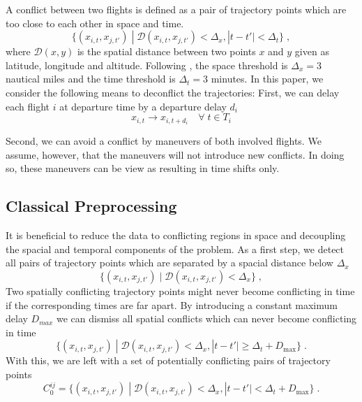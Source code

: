 \documentclass[aps,pra,twocolumn,10pt]{revtex4-1}
\begin{document}
A conflict between two flights is defined as a pair of trajectory points which are too close to each other in space and time.
\begin{equation} \label{eqn:conflicting_trajectory_points}
    \{ (x_{i, t},  x_{j, t'}) \; | \; \mathcal{D} (x_{i, t}, x_{j, t'}) < \Delta_x ,  |t - t'| < \Delta_t \} \; ,
\end{equation}
where $\mathcal{D}(x, y)$ is the spatial distance between two points $x$ and $y$ given as latitude, longitude and altitude.
Following \cite{rodionova16}, the space threshold is $\Delta_x = 3$ nautical miles and the time threshold is $\Delta_t = 3$ minutes.
In this paper, we consider the following means to deconflict the trajectories:
First, we can delay each flight $i$ at departure time by a departure delay $d_i$
\begin{equation*}
    x_{i, t} \to x_{i, t + d_i} \quad \forall \; t \in T_{i}
\end{equation*}

Second, we can avoid a conflict by maneuvers of both involved flights.
We assume, however, that the maneuvers will not introduce new conflicts. 
In doing so, these maneuvers can be view as resulting in time shifts only.

\subsection{Classical Preprocessing}
It is beneficial to reduce the data to conflicting regions in space and decoupling the spacial and temporal components of the problem.
As a first step, we detect all pairs of trajectory points which are separated by a spacial distance below $\Delta_x$ 
\begin{equation*}
    \{ (x_{i, t},  x_{j, t'}) \; | \; \mathcal{D} (x_{i, t}, x_{j, t'}) < \Delta_x \} \; ,
\end{equation*}
Two spatially conflicting trajectory points might never become conflicting in time if the corresponding times are far apart.
By introducing a constant maximum delay $D_{max}$ we can dismiss all spatial conflicts which can never become conflicting in time
\begin{equation*}
    \{ (x_{i, t},  x_{j, t'}) \; | \; \mathcal{D} (x_{i, t}, x_{j, t'}) < \Delta_x , |t-t'| \geq \Delta_t + D_\text{max} \} \; .
\end{equation*}
With this, we are left with a set of potentially conflicting pairs of trajectory points
\begin{equation*}
    C^{ij}_0 = \{ (x_{i, t},  x_{j, t'}) \; | \; \mathcal{D} (x_{i, t}, x_{j, t'}) < \Delta_x , |t-t'| < \Delta_t + D_\text{max} \} \; .
\end{equation*}
\end{document}
